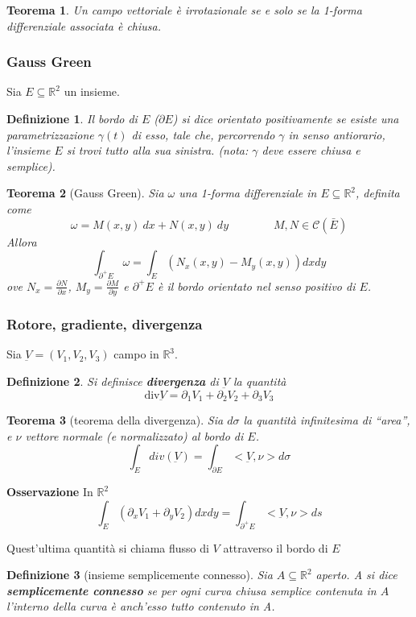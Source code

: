 \documentclass[a4paper,12pt]{article}
\newcommand{\cont}{\mathscr{C}}
\newtheorem{teo}{Teorema}
\newtheorem{defi}{Definizione}
\begin{document}
\begin{teo}
Un campo vettoriale è irrotazionale se e solo se la 1-forma differenziale associata è chiusa.
\end{teo}

\subsubsection{Gauss Green}
Sia $E\subseteq \mathbb{R}^2$ un insieme.
\begin{defi}
Il bordo di $E$ ($\partial E$) si dice orientato positivamente se esiste una parametrizzazione $\gamma(t)$ di esso, tale che, percorrendo $\gamma$ in senso antiorario, l'insieme $E$ si trovi tutto alla sua sinistra. (nota: $\gamma$ deve essere chiusa e semplice).
\end{defi}

\begin{teo}[Gauss Green]
Sia $\omega$ una 1-forma differenziale in $E\subseteq\mathbb{R}^2$, definita come
$$\omega=M(x,y)\ dx+N(x,y)\ dy\qquad\qquad M,N\in\cont(\bar E)$$
Allora
$$\int_{\partial^+E}\omega = \int_{E} \left( N_x(x,y)-M_y(x,y) \right)dxdy$$
ove $N_x = \frac{\partial N}{\partial x}$, $M_y = \frac{\partial M}{\partial y}$ e $\partial^+E$ è il bordo orientato nel senso positivo di $E$.
\end{teo}

\subsubsection{Rotore, gradiente, divergenza}

Sia $\underbar{V}=(V_1, V_2, V_3)$ campo in $\mathbb{R}^3$.
\begin{defi}
Si definisce \textbf{divergenza} di $\underbar{V}$ la quantità
$$\text{div}\underbar{V}= \partial_1V_1 + \partial_2V_2 + \partial_3V_3$$
\end{defi}

\begin{teo}[teorema della divergenza]
Sia $d\sigma$ la quantità infinitesima di ``area'', e $\nu$ vettore normale (e normalizzato) al bordo di $E$.
$$\int_E div(\underbar{V}) = \int_{\partial E} <\underbar{V},\nu> d\sigma$$
\end{teo}
\textbf{Osservazione}
In $\mathbb{R}^2$
$$\int_E (\partial_xV_1 + \partial_yV_2)dxdy = \int_{\partial^+ E} <\underbar{V},\nu> ds$$

Quest'ultima quantità si chiama flusso di $V$ attraverso il bordo di $E$


\begin{defi}[insieme semplicemente connesso]
Sia $A\subseteq\mathbb{R}^2$ aperto. A si dice \textbf{semplicemente connesso} se per ogni curva chiusa semplice contenuta in $A$ l'interno della curva è anch'esso tutto contenuto in A.
\end{defi}
\end{document}
